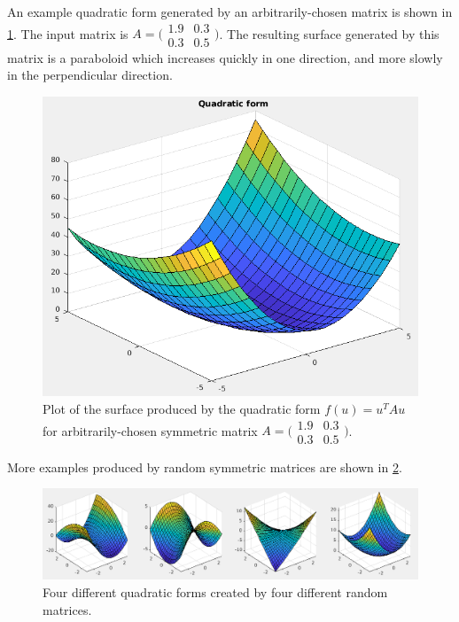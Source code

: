 \documentclass[onefignum,onetabnum]{siamart190516}
\begin{document}
An example quadratic form
generated by an arbitrarily-chosen matrix is shown in \cref{fig:QuadraticForm}.
The input matrix is $A = \bigl( \begin{smallmatrix} 1.9 & 0.3 \\ 0.3 & 0.5 \end{smallmatrix}\bigr)$.
The resulting surface generated by this matrix is a paraboloid which increases quickly
in one direction, and more slowly in the perpendicular direction.
\begin{figure}[thb]
	\centering
	\includegraphics[width=0.7\columnwidth]{QuadraticForm.png}
	\caption{Plot of the surface produced by the quadratic form $f(u) = u^T A u$
		for arbitrarily-chosen symmetric matrix 
		$A = \bigl( \begin{smallmatrix} 1.9 & 0.3 \\ 0.3 & 0.5 \end{smallmatrix}\bigr)$.}
	\label{fig:QuadraticForm}
\end{figure}
More examples produced by random symmetric matrices are shown in \cref{fig:QuadraticForms_multiple}.
\begin{figure}[thb]
	\centering
	\includegraphics[width=1.0\columnwidth]{QuadraticForms_multiple.png}
	\caption{Four different quadratic forms created by four different random matrices.}
	\label{fig:QuadraticForms_multiple}
\end{figure}
\end{document}
